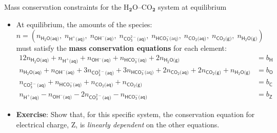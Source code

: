 \begin{frame}[<+->]{Mass conservation constraints for the H$_{\boldsymbol{2}}$O–CO$_{\boldsymbol{2}}$
system at equilibrium}
 
\begin{itemize}
\item At equilibrium, the amounts of the species:
\[
n=(n_{\mathsf{H_{2}O\text{(aq)}}},\;n_{\mathsf{H^{+}\text{(aq)}}},\;n_{\mathsf{OH^{-}\text{(aq)}}},\;n_{\mathsf{CO_{3}^{2-}\text{(aq)}}},\;n_{\mathsf{HCO_{3}^{-}}\text{(aq)}},\;n_{\mathsf{CO_{2}\text{(aq)}}},\;n_{\mathsf{CO_{2}\text{(g)}}},\;n_{\mathsf{H_{2}O\text{(g)}}})
\]
must satisfy the \textbf{mass conservation equations} for each element:{\small{}
\begin{alignat}{1}
2n_{\mathsf{H_{2}O\text{(aq)}}}+n_{\mathsf{H^{+}\text{(aq)}}}+n_{\mathsf{OH^{-}\text{(aq)}}}+n_{\mathsf{HCO_{3}^{-}\text{(aq)}}}+2n_{\mathsf{H_{2}O\text{(g)}}} & =b_{\mathsf{H}}\\
n_{\mathsf{H_{2}O\text{(aq)}}}+n_{\mathsf{OH^{-}\text{(aq)}}}+3n_{\mathsf{CO_{3}^{2-}\text{(aq)}}}+3n_{\mathsf{HCO_{3}^{-}}\text{(aq)}}+2n_{\mathsf{CO_{2}\text{(aq)}}}+2n_{\mathsf{CO_{2}\text{(g)}}}+n_{\mathsf{H_{2}O\text{(g)}}} & =b_{\mathsf{O}}\\
n_{\mathsf{CO_{3}^{2-}\text{(aq)}}}+n_{\mathsf{HCO_{3}^{-}\text{(aq)}}}+n_{\mathsf{CO_{2}\text{(aq)}}}+n_{\mathsf{CO_{2}\text{(g)}}} & =b_{\mathsf{C}}\\
n_{\mathsf{H^{+}\text{(aq)}}}-n_{\mathsf{OH^{-}\text{(aq)}}}-2n_{\mathsf{CO_{3}^{2-}\text{(aq)}}}-n_{\mathsf{HCO_{3}^{-}\text{(aq)}}} & =b_{\mathsf{Z}}
\end{alignat}
}{\small\par}
\item \alert{\textbf{Exercise}}: Show that, for this specific system, the conservation
equation for electrical charge, Z, is \emph{linearly dependent} on
the other equations.

\end{itemize}
\end{frame} 
%
%
